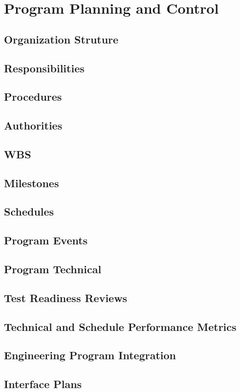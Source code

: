 %
\thispagestyle{fancy}
\chapter{Program Planning and Control}
\label{chp:program_plan}


\section{Organization Struture}

\section{Responsibilities}

\section{Procedures}

\section{Authorities}

\section{WBS}

\section{Milestones}

\section{Schedules}

\section{Program Events}

\section{Program Technical}

\section{Test Readiness Reviews}

\section{Technical and Schedule Performance Metrics}

\section{Engineering Program Integration}

\section{Interface Plans}
